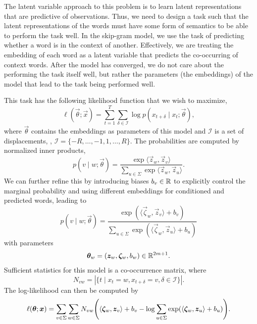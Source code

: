 The latent variable approach to this problem is to learn latent representations that are predictive
of observations. Thus, we need to design a task such that the latent representations of the words
must have some form of semantics to be able to perform the task well. In the skip-gram model, we
use the task of predicting whether a word is in the context of another. Effectively, we are treating the embedding of
each word as a latent variable that predicts the co-occurring of context words. After the model has
converged, we do not care about the performing the task itself well, but rather the parameters (the
embeddings) of the model that lead to the task being performed well.

This task has the following likelihood function that we wish to maximize, \[
    \ell(\vec{\theta}; \vec{x}) = \sum_{t=1}^{T} \sum_{\delta \in \mathcal{I}} \log p(x_{t+\delta} \mid x_t; \vec{\theta}),
\]
where $\vec{\theta}$ contains the embeddings as parameters of this model and $\mathcal{I}$ is a set
of displacements, \eg, $\mathcal{I} = \{ -R, \ldots, -1, 1, \ldots, R \}$. The probabilities are
computed by normalized inner products, \[
    p(v \mid w; \vec{\theta}) = \frac{\exp \langle \vec{z}_w, \vec{z}_v \rangle}{\sum_{u \in \Sigma} \exp \langle \vec{z}_w, \vec{z}_u \rangle}.
\]
We can further refine this by introducing biases $b_v \in \mathbb{R}$ to explicitly control the marginal
probability and using different embeddings for conditioned and predicted words, leading to \[
    p(v \mid w; \vec{\theta}) = \frac{\exp(\langle \vec{\zeta}_w, \vec{z}_v \rangle + b_v)}{\sum_{u \in \Sigma} \exp(\langle \vec{\zeta}_w, \vec{z}_u \rangle + b_u)}
\]
with parameters \[
    \bm{\theta}_w = (\bm{z}_w, \bm{\zeta}_w, b_w) \in \mathbb{R}^{2m+1}.
\]
Sufficient statistics for this model is a co-occurrence matrix, where \[
    N_{vw} = | \{ t \mid x_t = w, x_{t+\delta}=v, \delta \in \mathcal{I} \} |.
\]
The log-likelihood can then be computed by \[
    \ell(\vec{\theta}; \vec{x}) = \sum_{v \in \Sigma} \sum_{w \in \Sigma} N_{vw} \lft( \langle \vec{\zeta}_w, \vec{z}_v \rangle + b_v - \log \sum_{u \in \Sigma} \exp (\langle \vec{\zeta}_w, \vec{z}_u \rangle + b_u) \rgt).
\]

